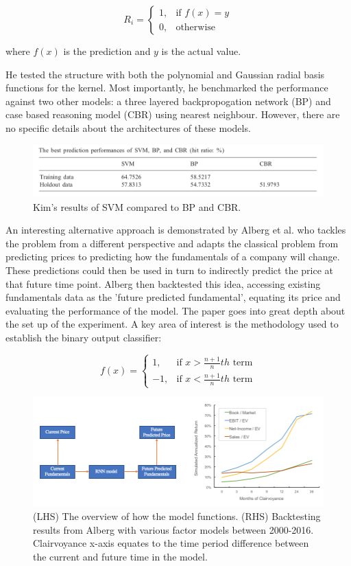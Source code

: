 \documentclass[10pt,onecolumn,letterpaper]{article}
\begin{document}
\vskip -1cm
\[R_{i} = 
\begin{cases}
	1,& \text{if } f(x) = y\\
	0,& \text{otherwise}
\end{cases}
\]

where $f(x)$ is the prediction and $y$ is the actual value.

He tested the structure with both the polynomial and Gaussian radial basis functions for the kernel. Most importantly, he benchmarked the performance against two other models: a three layered backpropogation network (BP) and case based reasoning model (CBR) using nearest neighbour. However, there are no specific details about the architectures of these models. 

\begin{figure}[!hbt!]
\centering
\includegraphics[width=14.5cm]{Kim_results.png}
\caption{Kim's results of SVM compared to BP and CBR.}
\end{figure}
 
An interesting alternative approach\cite{Alberg} is demonstrated by Alberg et al. who tackles the problem from a different perspective and adapts the classical problem from predicting prices to predicting how the fundamentals of a company will change. These predictions could then be used in turn to indirectly predict the price at that future time point. Alberg then backtested this idea, accessing existing fundamentals data as the 'future predicted fundamental', equating its price and evaluating the performance of the model. The paper goes into great depth about the set up of the experiment. A key area of interest is the methodology used to establish the binary output classifier: 

\[f(x)= 
\begin{cases}
	1,& \text{if } x > \frac{n+1}{n}th\text{ term}\\
    	-1,& \text{if } x < \frac{n+1}{n}th\text{ term}
\end{cases}
\]

\begin{figure}[!hbt!]
\centering
\includegraphics[width=14.5cm]{alberg_intro.png}
\caption{(LHS) The overview of how the model functions. (RHS) Backtesting results from Alberg with various factor models between 2000-2016. Clairvoyance x-axis equates to the time period difference between the current and future time in the model. }
\end{figure}
\end{document}
